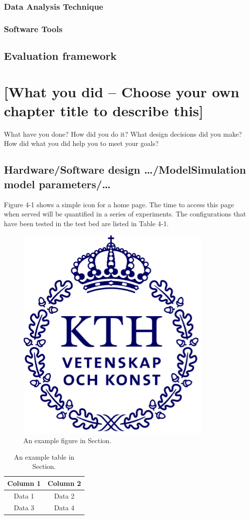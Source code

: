 \documentclass[a4paper,10pt,twocolumn]{article}
\numberwithin{figure}{section}
\numberwithin{table}{section}
\begin{document}
\subsubsection{Data Analysis Technique}
\subsubsection{Software Tools}


\subsection{Evaluation framework}




\section{[What you did – Choose your own chapter title to describe this]}
What have you done? How did you do it? What design decisions did you make? How did what you
did help you to meet your goals?

\subsection{Hardware/Software design …/ModelSimulation model parameters/…}
Figure 4-1 shows a simple icon for a home page. The time to access this page when served will be
quantified in a series of experiments. The configurations that have been tested in the test bed are
listed in Table 4-1.
\begin{figure}[htbp]
    \centering
    \includegraphics[width=0.4\linewidth]{kthLogga.png}  %
    \caption{An example figure in Section.}
    \label{fig:ldone}  
\end{figure}

\begin{table}[htbp]
    \centering
    \begin{tabular}{|c|c|}
        \hline
        Column 1 & Column 2 \\
        \hline
        Data 1 & Data 2 \\
        Data 3 & Data 4 \\
        \hline
    \end{tabular}
    \caption{An example table in Section.}
    \label{tab:done}  
\end{table}
\end{document}
